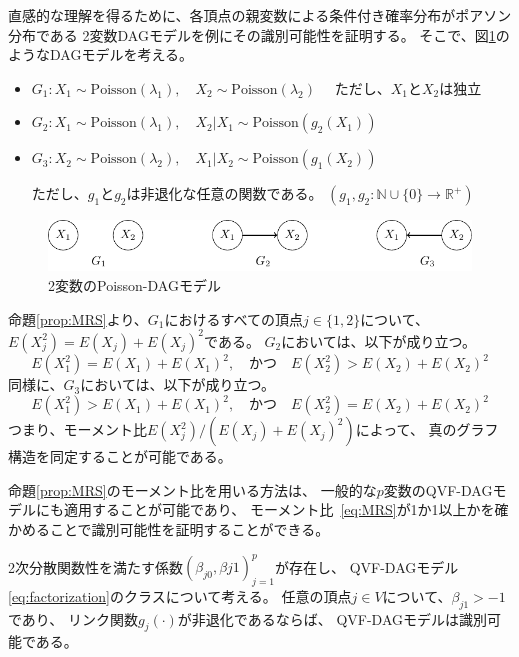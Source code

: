 直感的な理解を得るために、各頂点の親変数による条件付き確率分布がポアソン分布である
2変数DAGモデルを例にその識別可能性を証明する。
そこで、図\ref{fig:ex_bivariate}のようなDAGモデルを考える。

\begin{itemize}
  \item $G_1 \colon X_1 \sim \mathrm{Poisson}(\lambda_1),
         \quad X_2 \sim \mathrm{Poisson}(\lambda_2) \quad$ ただし、$X_1$と$X_2$は独立

  \item $G_2 \colon X_1 \sim \mathrm{Poisson}(\lambda_1),
         \quad X_2|X_1 \sim \mathrm{Poisson}(g_2(X_1))$

  \item $G_3 \colon X_2 \sim \mathrm{Poisson}(\lambda_2),
         \quad X_1|X_2 \sim \mathrm{Poisson}(g_1(X_2))$

  ただし、$g_1$と$g_2$は非退化な任意の関数である。
  $(g_1, g_2 \colon \mathbb{N} \cup \{ 0 \} \rightarrow \mathbb{R}^+)$
\end{itemize}

\begin{figure}[h]
  \centering
  \includegraphics{./picture/bivariate.pdf}
  \caption{2変数のPoisson-DAGモデル}
  \label{fig:ex_bivariate}
\end{figure}

命題\ref{prop:MRS}より、$G_1$におけるすべての頂点$j \in \{ 1,2 \}$について、
$E(X_j^2) = E(X_j) + E(X_j)^2$である。
$G_2$においては、以下が成り立つ。
\begin{equation*}
  E(X_1^2) = E(X_1) + E(X_1)^2, \quad \text{かつ} \quad
  E(X_2^2) > E(X_2) + E(X_2)^2
\end{equation*}
同様に、$G_3$においては、以下が成り立つ。
\begin{equation*}
  E(X_1^2) > E(X_1) + E(X_1)^2, \quad \text{かつ} \quad
  E(X_2^2) = E(X_2) + E(X_2)^2
\end{equation*}
つまり、モーメント比$E(X_j^2) / (E(X_j) + E(X_j)^2)$によって、
真のグラフ構造を同定することが可能である。

命題\ref{prop:MRS}のモーメント比を用いる方法は、
一般的な$p$変数のQVF-DAGモデルにも適用することが可能であり、
モーメント比~\eqref{eq:MRS}が1か1以上かを確かめることで識別可能性を証明することができる。

\begin{theo}
  2次分散関数性を満たす係数$(\beta_{j0}, \beta{j1})_{j=1}^p$が存在し、
  QVF-DAGモデル\eqref{eq:factorization}のクラスについて考える。
  任意の頂点$j \in V$について、$\beta_{j1} > -1$であり、
  リンク関数$g_j(\cdot)$が非退化であるならば、
  QVF-DAGモデルは識別可能である。
\end{theo}

